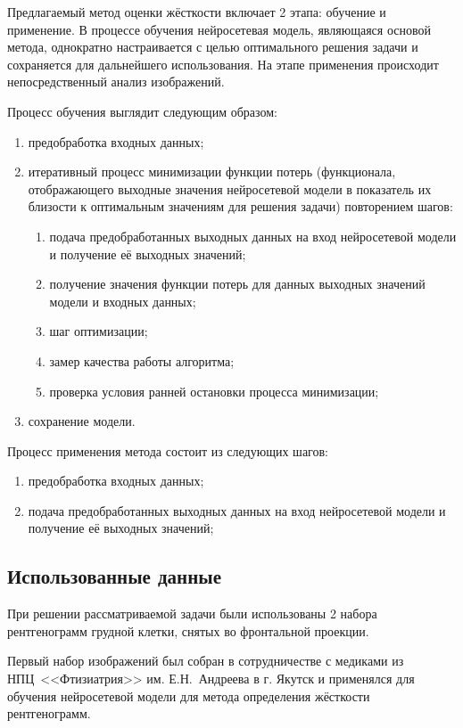Предлагаемый метод оценки жёсткости включает 2 этапа: обучение и применение. В процессе обучения нейросетевая модель, являющаяся основой метода, однократно настраивается с целью оптимального решения задачи и сохраняется для дальнейшего использования. На этапе применения происходит непосредственный анализ изображений.

Процесс обучения выглядит следующим образом:
\begin{enumerate}[beginpenalty=10000]
	\item предобработка входных данных;
	\item итеративный процесс минимизации функции потерь (функционала, отображающего выходные значения нейросетевой модели в показатель их близости к оптимальным значениям для решения задачи) повторением шагов:
	\begin{enumerate}[beginpenalty=10000]
		\item подача предобработанных выходных данных на вход нейросетевой модели и получение её выходных значений;
		\item получение значения функции потерь для данных выходных значений модели и входных данных;
		\item шаг оптимизации;
		\item замер качества работы алгоритма;
		\item проверка условия ранней остановки процесса минимизации;
	\end{enumerate}
	\item сохранение модели.	
\end{enumerate}

Процесс применения метода состоит из следующих шагов:
\begin{enumerate}[beginpenalty=10000]
	\item предобработка входных данных;
	\item подача предобработанных выходных данных на вход нейросетевой модели и получение её выходных значений;
\end{enumerate}

\subsection{Использованные данные}

При решении рассматриваемой задачи были использованы 2 набора рентгенограмм грудной клетки, снятых во фронтальной проекции.

Первый набор изображений был собран в сотрудничестве с медиками из НПЦ~<<Фтизиатрия>> им. Е.Н.~Андреева в г. Якутск и применялся для обучения нейросетевой модели для метода определения жёсткости рентгенограмм.

